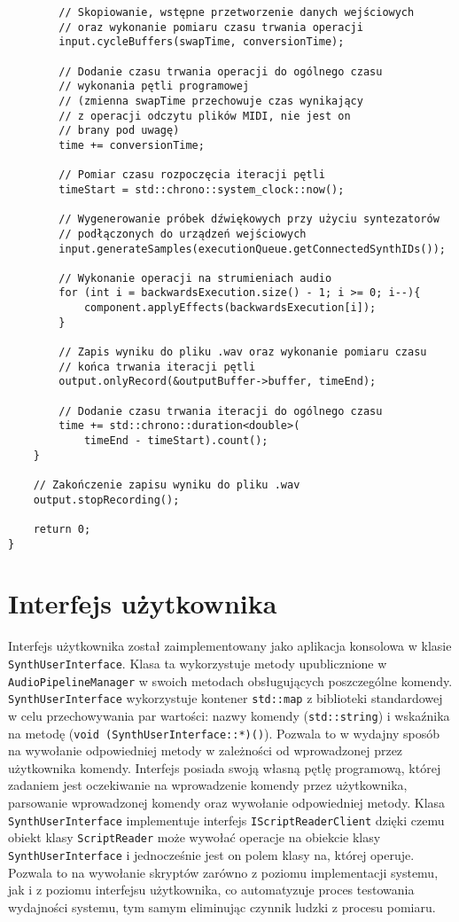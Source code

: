 \begin{lstlisting}
        // Skopiowanie, wstępne przetworzenie danych wejściowych
        // oraz wykonanie pomiaru czasu trwania operacji
        input.cycleBuffers(swapTime, conversionTime);

        // Dodanie czasu trwania operacji do ogólnego czasu
        // wykonania pętli programowej
        // (zmienna swapTime przechowuje czas wynikający
        // z operacji odczytu plików MIDI, nie jest on
        // brany pod uwagę)
        time += conversionTime;

        // Pomiar czasu rozpoczęcia iteracji pętli
        timeStart = std::chrono::system_clock::now();

        // Wygenerowanie próbek dźwiękowych przy użyciu syntezatorów
        // podłączonych do urządzeń wejściowych
        input.generateSamples(executionQueue.getConnectedSynthIDs());

        // Wykonanie operacji na strumieniach audio
        for (int i = backwardsExecution.size() - 1; i >= 0; i--){
            component.applyEffects(backwardsExecution[i]);
        }

        // Zapis wyniku do pliku .wav oraz wykonanie pomiaru czasu
        // końca trwania iteracji pętli
        output.onlyRecord(&outputBuffer->buffer, timeEnd);

        // Dodanie czasu trwania iteracji do ogólnego czasu
        time += std::chrono::duration<double>(
            timeEnd - timeStart).count();
    }

    // Zakończenie zapisu wyniku do pliku .wav
    output.stopRecording();

    return 0;
}
\end{lstlisting}

\clearpage
\section{Interfejs użytkownika}
Interfejs użytkownika został zaimplementowany jako aplikacja konsolowa w klasie \texttt{SynthUserInterface}. Klasa ta wykorzystuje metody upublicznione w \texttt{AudioPipelineManager} w swoich metodach obsługujących poszczególne komendy. \texttt{SynthUserInterface} wykorzystuje kontener \texttt{std::map} z biblioteki standardowej w celu przechowywania par wartości: nazwy komendy (\texttt{std::string}) i wskaźnika na metodę (\texttt{void (SynthUserInterface::*)()}). Pozwala to w wydajny sposób na wywołanie odpowiedniej metody w zależności od wprowadzonej przez użytkownika komendy. Interfejs posiada swoją własną pętlę programową, której zadaniem jest oczekiwanie na wprowadzenie komendy przez użytkownika, parsowanie wprowadzonej komendy oraz wywołanie odpowiedniej metody. Klasa \texttt{SynthUserInterface} implementuje interfejs \texttt{IScriptReaderClient} dzięki czemu obiekt klasy \texttt{ScriptReader} może wywołać operacje na obiekcie klasy \texttt{SynthUserInterface} i jednocześnie jest on polem klasy na, której operuje. Pozwala to na wywołanie skryptów zarówno z poziomu implementacji systemu, jak i z poziomu interfejsu użytkownika, co automatyzuje proces testowania wydajności systemu, tym samym eliminując czynnik ludzki z procesu pomiaru.
